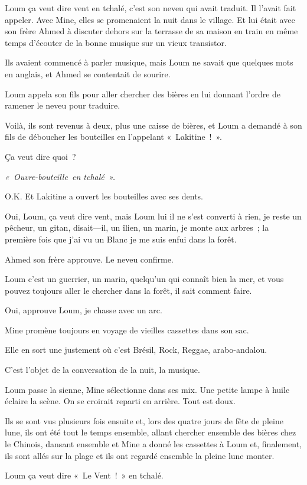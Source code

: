 \documentclass[french,twoside]{book} %
\begin{document}
\noindent Loum ça veut dire vent en tchalé, c’est son neveu qui avait traduit. Il l’avait fait appeler. Avec Mine, elles se promenaient la nuit dans le village. Et lui était avec son frère Ahmed à discuter dehors sur la terrasse de sa maison en train en même temps d’écouter de la bonne musique sur un vieux transistor.\par
Ils avaient commencé à parler musique, mais Loum ne savait que quelques mots en anglais, et Ahmed se contentait de sourire.\par
Loum appela son fils pour aller chercher des bières en lui donnant l’ordre de ramener le neveu pour traduire.\par
Voilà, ils sont revenus à deux, plus une caisse de bières, et Loum a demandé à son fils de déboucher les bouteilles en l’appelant « Lakitine ! ».\par
Ça veut dire quoi ?\par
\emph{« Ouvre-bouteille en tchalé ».}\par
O.K. Et Lakitine a ouvert les bouteilles avec ses dents.\par
Oui, Loum, ça veut dire vent, mais Loum lui il ne s’est converti à rien, je reste un pêcheur, un gitan, disait—il, un îlien, un marin, je monte aux arbres ; la première fois que j’ai vu un Blanc je me suis enfui dans la forêt.\par
Ahmed son frère approuve. Le neveu confirme.\par
Loum c’est un guerrier, un marin, quelqu’un qui connaît bien la mer, et vous pouvez toujours aller le chercher dans la forêt, il sait comment faire.\par
Oui, approuve Loum, je chasse avec un arc.\par
Mine promène toujours en voyage de vieilles cassettes dans son sac.\par
Elle en sort une justement où c’est Brésil, Rock, Reggae, arabo-andalou.\par
C’est l’objet de la conversation de la nuit, la musique.\par
Loum passe la sienne, Mine sélectionne dans ses mix. Une petite lampe à huile éclaire la scène. On se croirait reparti en arrière. Tout est doux.\par
Ils se sont vus plusieurs fois ensuite et, lors des quatre jours de fête de pleine lune, ils ont été tout le temps ensemble, allant chercher ensemble des bières chez le Chinois, dansant ensemble et Mine a donné les cassettes à Loum et, finalement, ils sont allés sur la plage et ils ont regardé ensemble la pleine lune monter.\par
Loum ça veut dire « Le Vent ! » en tchalé.
\end{document}
